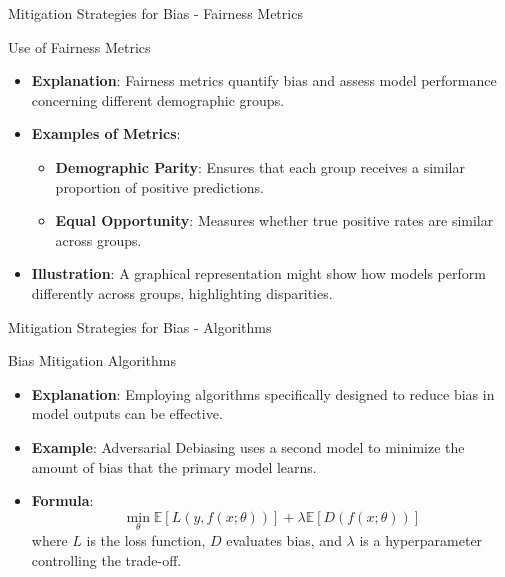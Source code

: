 \documentclass[aspectratio=169]{beamer}
\begin{document}
\begin{frame}[fragile]{Mitigation Strategies for Bias - Fairness Metrics}
    \begin{block}{Use of Fairness Metrics}
        \begin{itemize}
            \item \textbf{Explanation}: Fairness metrics quantify bias and assess model performance concerning different demographic groups.
            \item \textbf{Examples of Metrics}:
            \begin{itemize}
                \item \textbf{Demographic Parity}: Ensures that each group receives a similar proportion of positive predictions.
                \item \textbf{Equal Opportunity}: Measures whether true positive rates are similar across groups.
            \end{itemize}
            \item \textbf{Illustration}: A graphical representation might show how models perform differently across groups, highlighting disparities.
        \end{itemize}
    \end{block}
\end{frame}

\begin{frame}[fragile]{Mitigation Strategies for Bias - Algorithms}
    \begin{block}{Bias Mitigation Algorithms}
        \begin{itemize}
            \item \textbf{Explanation}: Employing algorithms specifically designed to reduce bias in model outputs can be effective.
            \item \textbf{Example}: Adversarial Debiasing uses a second model to minimize the amount of bias that the primary model learns.
            \item \textbf{Formula}:
            \begin{equation}
            \min_{\theta} \mathbb{E}[L(y, f(x; \theta))] + \lambda \mathbb{E}[D(f(x; \theta))]
            \end{equation}
            where \( L \) is the loss function, \( D \) evaluates bias, and \( \lambda \) is a hyperparameter controlling the trade-off.
        \end{itemize}
    \end{block}
\end{frame}
\end{document}
